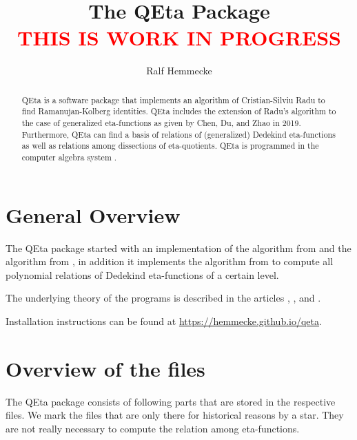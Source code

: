 \documentclass{article}
\begin{document}
\title{The QEta Package\\
\textcolor{red}{THIS IS WORK IN PROGRESS}}
\author{Ralf Hemmecke}
\maketitle
\begin{abstract}
  QEta is a software package that implements an algorithm of
  Cristian-Silviu Radu to find Ramanujan-Kolberg identities. QEta
  includes the extension of Radu's algorithm to the case of
  generalized eta-functions as given by Chen, Du, and Zhao in 2019.
  Furthermore, QEta can find a basis of relations of (generalized)
  Dedekind eta-functions as well as relations among dissections of
  eta-quotients.
  QEta is programmed in the computer algebra system \FriCAS{}.
\end{abstract}

\tableofcontents

\section{General Overview}

The QEta package started with an implementation of the 
algorithm from \cite{Radu_RamanujanKolberg_2015} and the \algoSamba{}
algorithm from \cite{Hemmecke_DancingSambaRamanujan_2018}, in addition
it implements the algorithm from
\cite{HemmeckeRadu_EtaRelations_2019} to compute all polynomial
relations of Dedekind eta-functions of a certain level.

The underlying theory of the programs is described in the articles
\cite{Radu_RamanujanKolberg_2015},
\cite{Hemmecke_DancingSambaRamanujan_2018}, and
\cite{HemmeckeRadu_EtaRelations_2019}.

Installation instructions can be found at
\url{https://hemmecke.github.io/qeta}.

\section{Overview of the files}

The QEta package consists of following parts that are stored in the
respective  files. We mark the files that are only
there for historical reasons by a star. They are not really necessary
to compute the relation among eta-functions.
\end{document}
